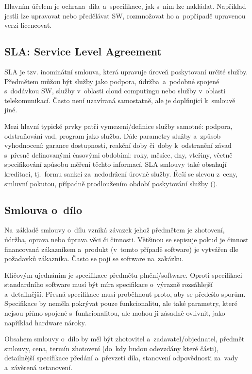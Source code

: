 Hlavním účelem je ochrana~díla~a~specifikace, jak s~ním lze nakládat. Například jestli lze upravovat nebo předělávat SW, rozmnožovat ho a~popřípadě upravenou verzi licencovat.

\subsection{SLA: Service Level Agreement}

SLA je tzv. inominátní smlouva, která upravuje úroveň poskytovaní určité služby. Předmětem můžou být služby jako podpora, údržba~a~podobné spojené s~dodávkou SW, služby v~oblasti cloud computingu nebo služby v~oblasti telekomunikací. Často není uzavíraná samostatně, ale je doplňující k~smlouvě jiné.

Mezi hlavní typické prvky patří vymezení/definice služby samotné: podpora, odstraňování vad, program jako služba. Dále parametry služby a~způsob vyhodnocení: garance dostupnosti, reakční doby či~doby k~odstranění závad s~přesně definovanými časovými obdobími: roky, měsíce, dny, vteřiny, včetně specifikování způsobu měření těchto informací. SLA smlouvy také obsahují kreditaci, tj.~formu sankcí za~nedodržení úrovně služby. Řeší se slevou z~ceny, smluvní pokutou, případně prodloužením období poskytování služby ().

\subsection{Smlouva o~dílo}

Na~základě smlouvy o~dílu vzniká závazek jehož předmětem je zhotovení, údržba, oprava nebo úprava věci či činnosti. Většinou se sepisuje pokud je činnost financovaná zákazníkem a~produkt (v~tomto případě software) je vytvářen dle požadavků zákazníka. Často se pojí se software na~zakázku.

Klíčovým ujednáním je specifikace předmětu plnění/software. Oproti specifikaci standardního software musí být míra specifikace o~výrazně rozsáhlejší a~detailnější. Přesná specifikace musí proběhnout proto, aby se předešlo sporům. Specifikace by neměla pokrývat pouze funkcionalitu, ale také parametry, které nejsou přímo spojené s~funkcionalitou, ale mohou ji zásadně ovlivnit, jako například hardware nároky.

Obsahem smlouvy o~dílo by měl být zhotovitel a~zadavatel/objednatel, předmět smlouvy, cena, termín zhotovení (do~kdy budou odevzdány které části), detailnější specifikace předání a~převzetí díla, stanovení odpovědnosti za~vady a~závěrená ustanovení.

